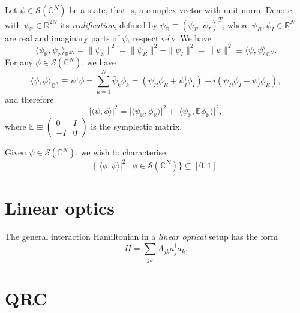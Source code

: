 \documentclass[12pt]{report}
\newcommand{\CC}{\mathbb{C}}
\newcommand{\EE}{\mathbb{E}}
\newcommand{\RR}{\mathbb{R}}
\newcommand{\calS}{{\mathcal{S}}}
\begin{document}
Let $\psi\in\calS(\CC^N)$ be a state, that is, a complex vector with unit norm.
Denote with $\psi_\RR\in\RR^{2N}$ its \emph{realification}, defined by
$\psi_\RR\equiv(\psi_R,\psi_I)^T$, where $\psi_R,\psi_I\in\RR^N$ are real and imaginary parts of $\psi$, respectively. We have
\begin{equation}
	\langle \psi_\RR,\psi_\RR\rangle_{\RR^{2N}}
	= \|\psi_\RR\|^2 = \|\psi_R\|^2 + \|\psi_I\|^2
	= \|\psi\|^2 \equiv \langle \psi,\psi\rangle_{\CC^N}.
\end{equation}
For any $\phi\in\calS(\CC^N)$, we have
\begin{equation}
	\langle \psi,\phi\rangle_{\CC^N}
	\equiv \psi^\dagger \phi
	= \sum_{k=1}^N \bar\psi_k \phi_k
	= (\psi_R^\dagger\phi_R + \psi_I^\dagger \phi_I)
	+ i(\psi_R^\dagger \phi_I - \psi_I^\dagger\phi_R),
\end{equation}
and therefore
\begin{equation}
	\lvert\langle \psi,\phi\rangle\rvert^2
	= \lvert \langle \psi_\RR,\phi_\RR\rangle \rvert^2
	+ \lvert \langle \psi_\RR,\EE\phi_\RR\rangle \rvert^2,
\end{equation}
where $\EE\equiv \begin{pmatrix}0 & I \\ -I & 0\end{pmatrix}$ is the symplectic matrix.

Given $\psi\in\calS(\CC^N)$, we wish to characterise
\begin{equation}
	\{ \lvert\langle \phi,\psi\rangle\rvert^2 : \,\,\phi\in\calS(\CC^N) \}
	\subseteq [0,1].
\end{equation}

\section{Linear optics}

The general interaction Hamiltonian in a \emph{linear optical} setup has the form
\begin{equation}
	H = \sum_{jk} A_{jk} a_j^\dagger a_k.
\end{equation}


\section{QRC}
\end{document}

